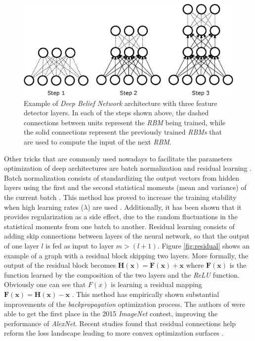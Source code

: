 \begin{figure}
	\centering
	\includegraphics[width=1\linewidth]{chapter2/images/dbn}
	\caption{Example of \textit{Deep Belief Network} architecture with three feature detector layers. In each of the steps shown above, the dashed connections between units represent the \textit{RBM} being trained, while the solid connections represent the previously trained \textit{RBMs} that are used to compute the input of the next \textit{RBM}.}
	\label{fig:dbn}
\end{figure}



Other tricks that are commonly used nowadays to facilitate the parameters optimization of deep architectures are batch normalization \autocite{ioffe2015} and residual learning \autocite{kaiming2016}. Batch normalization consists of standardizing the output vectors from hidden layers using the first and the second statistical moments (mean and variance) of the current batch \autocite{ioffe2015}. This method has proved to increase the training stability when high learning rates ($\lambda$) are used \autocite{Goodfellow2016}. Additionally, it has been shown that it provides regularization \autocite{dauphin2021} as a side effect, due to the random fluctuations in the statistical moments from one batch to another. Residual learning consists of adding skip connections between layers of the neural network, so that the output of one layer $l$ is fed as input to layer $m > (l+1)$. Figure \ref{fig:residual} shows an example of a graph with a residual block skipping two layers. More formally, the output of the residual block becomes $\mathbf{H(x)} = \mathbf{F(x)} + \mathbf{x}$ where $\mathbf{F(x)}$ is the function learned by the composition of the two layers and the \textit{ReLU} function. Obviously one can see that $F(x)$ is learning a residual mapping $\mathbf{F(x)} = \mathbf{H(x)} - \mathbf{x}$ \autocite{kaiming2016}. This method has empirically shown substantial improvements of the \textit{backpropagation} optimization process. The authors of \autocite{kaiming2016} were able to get the first place in the 2015 \textit{ImageNet} contest, improving the performance of \textit{AlexNet}. Recent studies found that residual connections help reform the loss landscape leading to more convex optimization surfaces \autocite{freeman2017, wang2020a}.


